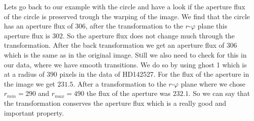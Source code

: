 Lets go back to our example with the circle and have a look if the aperture flux of the circle is preserved trough the warping of the image. We find that the circle has an aperture flux of $306$, after the transformation to the $r$-$\varphi$ plane this aperture flux is $302$. So the aperture flux does not change much through the transformation. After the back transformation we get an aperture flux of $306$ which is the same as in the original image. Still we also need to check for this in our data, where we have smooth transitions. We do so by using ghost 1 which is at a radius of $390$ pixels in the data of HD142527. For the flux of the aperture in the image we get $231.5$. After a transformation to the $r$-$\varphi$ plane where we chose $r_{min}=290$ and $r_{max}=490$ the flux of the aperture was $232.1$. So we can say that the transformation conserves the aperture flux which is a really good and important property.